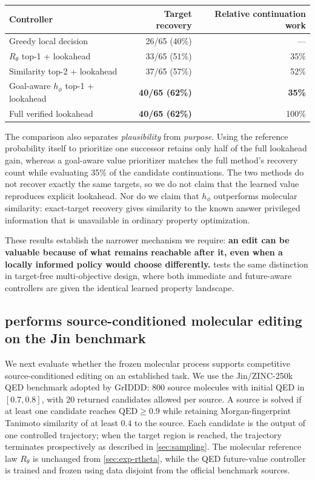 \begin{center}
{\small
\begin{tabular}{lrr}
\toprule
Controller & Target recovery & Relative continuation work \\
\midrule
Greedy local decision & 26/65 (40\%) & --- \\
$R_\theta$ top-1 + lookahead & 33/65 (51\%) & 35\% \\
Similarity top-2 + lookahead & 37/65 (57\%) & 52\% \\
Goal-aware $h_\phi$ top-1 + lookahead & \textbf{40/65 (62\%)} & \textbf{35\%} \\
Full verified lookahead & \textbf{40/65 (62\%)} & 100\% \\
\bottomrule
\end{tabular}}
\end{center}

The comparison also separates \emph{plausibility} from \emph{purpose}. Using the reference probability itself to prioritize one successor retains only half of the full lookahead gain, whereas a goal-aware value prioritizer matches the full method's recovery count while evaluating 35\% of the candidate continuations. The two methods do not recover exactly the same targets, so we do not claim that the learned value reproduces explicit lookahead. Nor do we claim that $h_\phi$ outperforms molecular similarity: exact-target recovery gives similarity to the known answer privileged information that is unavailable in ordinary property optimization.

These results establish the narrower mechanism we require: \textbf{an edit can be valuable because of what remains reachable after it, even when a locally informed policy would choose differently.}  tests the same distinction in target-free multi-objective design, where both immediate and future-aware controllers are given the identical learned property landscape.

\subsection{\method{} performs source-conditioned molecular editing on the Jin benchmark}
\label{sec:exp-jin}

We next evaluate whether the frozen \method{} molecular process supports competitive source-conditioned editing on an established task. We use the Jin/ZINC-250k QED benchmark adopted by GrIDDD: 800 source molecules with initial QED in $[0.7,0.8]$, with 20 returned candidates allowed per source. A source is solved if at least one candidate reaches $\mathrm{QED}\ge0.9$ while retaining Morgan-fingerprint Tanimoto similarity of at least $0.4$ to the source. Each \method{} candidate is the output of one controlled trajectory; when the target region is reached, the trajectory terminates prospectively as described in \cref{sec:sampling}. The molecular reference law $R_\theta$ is unchanged from \cref{sec:exp-rtheta}, while the QED future-value controller is trained and frozen using data disjoint from the official benchmark sources.

